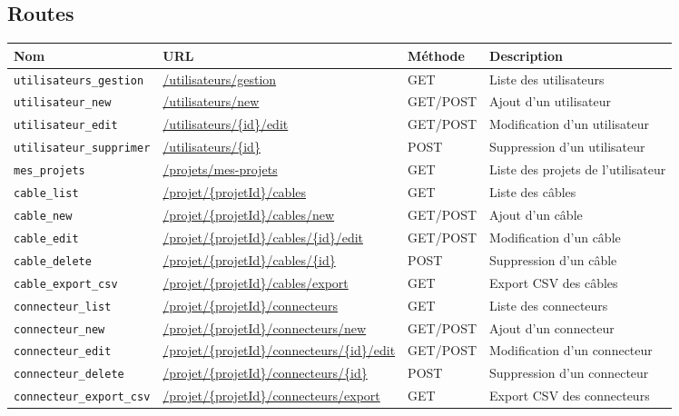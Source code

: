 \documentclass[a4paper,12pt]{article}
\begin{document}
\subsection{Routes}
\begin{longtable}{|p{3.5cm}|p{4.5cm}|p{2cm}|p{4cm}|}
\hline
\textbf{Nom} & \textbf{URL} & \textbf{Méthode} & \textbf{Description} \\ \hline
\texttt{utilisateurs\_gestion} & \url{/utilisateurs/gestion} & GET & Liste des utilisateurs \\ \hline
\texttt{utilisateur\_new} & \url{/utilisateurs/new} & GET/POST & Ajout d’un utilisateur \\ \hline
\texttt{utilisateur\_edit} & \url{/utilisateurs/\{id\}/edit} & GET/POST & Modification d’un utilisateur \\ \hline
\texttt{utilisateur\_supprimer} & \url{/utilisateurs/\{id\}} & POST & Suppression d’un utilisateur \\ \hline
\texttt{mes\_projets} & \url{/projets/mes-projets} & GET & Liste des projets de l’utilisateur \\ \hline
\texttt{cable\_list} & \url{/projet/\{projetId\}/cables} & GET & Liste des câbles \\ \hline
\texttt{cable\_new} & \url{/projet/\{projetId\}/cables/new} & GET/POST & Ajout d’un câble \\ \hline
\texttt{cable\_edit} & \url{/projet/\{projetId\}/cables/\{id\}/edit} & GET/POST & Modification d’un câble \\ \hline
\texttt{cable\_delete} & \url{/projet/\{projetId\}/cables/\{id\}} & POST & Suppression d’un câble \\ \hline
\texttt{cable\_export\_csv} & \url{/projet/\{projetId\}/cables/export} & GET & Export CSV des câbles \\ \hline
\texttt{connecteur\_list} & \url{/projet/\{projetId\}/connecteurs} & GET & Liste des connecteurs \\ \hline
\texttt{connecteur\_new} & \url{/projet/\{projetId\}/connecteurs/new} & GET/POST & Ajout d’un connecteur \\ \hline
\texttt{connecteur\_edit} & \url{/projet/\{projetId\}/connecteurs/\{id\}/edit} & GET/POST & Modification d’un connecteur \\ \hline
\texttt{connecteur\_delete} & \url{/projet/\{projetId\}/connecteurs/\{id\}} & POST & Suppression d’un connecteur \\ \hline
\texttt{connecteur\_export\_csv} & \url{/projet/\{projetId\}/connecteurs/export} & GET & Export CSV des connecteurs \\ \hline
\end{longtable}
\end{document}
